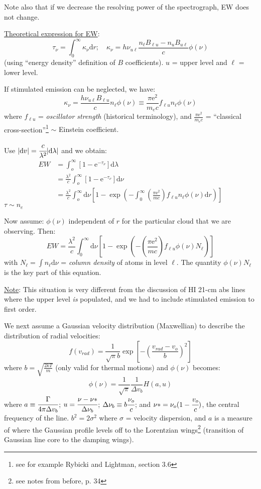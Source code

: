 \documentclass[12pt]{article}
\newcommand{\mar}[1]{\hspace{0pt}\marginpar{-\textcolor{black}{#1}-}}
\newcommand{\mynotes}[1]{\textcolor{mygreen}{#1}}
\begin{document}
\mar{91}Note also that if we decrease the resolving power of the
spectrograph, EW does not change.

\underline{Theoretical expression for EW}:$${
    \tau_{\nu} = \int_{0}^{\infty}{\kappa_{\nu}\mathrm{d}r};\quad
    \kappa_{\nu} = h\nu_{u\ell}
    \frac{n_{\ell}B_{\ell{u}}-n_{u}B_{u\ell}}{c}\phi(\nu)
}$$(using ``energy density'' definition of $B$ coefficients).
$u$ = upper level and $\ell$ = lower level.

If stimulated emission can be neglected, we have:$${
    \kappa_{\nu} = \frac{h\nu_{u\ell}B_{\ell{u}}}{c}n_{\ell}\phi(\nu) \equiv
    \frac{\pi\mathrm{e}^{2}}{m_{e}c}f_{\ell{u}}n_{\ell}\phi(\nu)
}$$
where $f_{\ell{u}}$ = \emph{oscillator strength}
\mynotes{(historical terminology)},
and $\frac{\pi\mathrm{e}^{2}}{m_{e}c}$ = ``classical cross-section''\footnote{
    see for example Rybicki and Lightman, section 3.6}
\mynotes{$\sim$ Einstein coefficient.}

Use
$\vert\mathrm{d}v\vert = \cfrac{c}{\lambda^{2}}\vert\mathrm{d}{\lambda}\vert$
and we obtain:
\begin{align*}
    EW &= \int_{o}^{\infty}{\left[1-\mathrm{e}^{-\tau_{\nu}}\right]\mathrm{d}\lambda}\\
    &= \frac{\lambda^{2}}{c}\int_{o}^{\infty}{
        \left[1-\mathrm{e}^{-\tau_{\nu}}\right]\mathrm{d}\nu}\\
    &= \frac{\lambda^{2}}{c}\int_{o}^{\infty}{\mathrm{d}\nu\left[1-\exp\left(
    -\int_{0}^{\infty}{\left(\frac{\pi\mathrm{e}^{2}}{mc}\right)
    f_{\ell{u}}n_{\ell}\phi(\nu)\mathrm{d}r}\right)\right]}
\end{align*}
\mynotes{$\tau\sim{n_{e}}$}

Now assume: $\phi(\nu)$ independent of $r$ for the particular cloud
that we are observing. Then:$${
    EW = \frac{\lambda^{2}}{c}\int_{0}^{\infty}{
        \mathrm{d}\nu\left[1-\exp\left(-\left(\frac{\pi\mathrm{e}^{2}}{mc}\right)
        f_{\ell{u}}\phi(\nu)N_{\ell}\right)\right]}
}$$with $N_{\ell} = \int{n_{\ell}\mathrm{d}\nu}$ = \emph{column density}
of atoms in level $\ell$. The quantity $\phi(\nu)N_{\ell}$ is the key
part of this equation.

\mar{92}\underline{Note}: This situation is very different from the
discussion of HI 21-cm abs lines where the upper level \emph{is}
populated, and we had to include stimulated emission to first order.

We next assume a Gaussian velocity distribution (Maxwellian) to
describe the distribution of radial velocities:$${
    f(v_{rad}) = \frac{1}{\sqrt{\pi}b}\exp\left[
        -\left(\frac{v_{rad}-v_{o}}{b}\right)^{2}\right]
}$$where $b = \sqrt{\frac{2kT}{m}}$ (only valid for thermal motions)
and $\phi(\nu)$ becomes:$${
    \phi(\nu) = \frac{1}{\sqrt{\pi}}\frac{1}{\Delta{v_{b}}}H(a,u)
}$$where $a \equiv \cfrac{\Gamma}{4\pi\Delta{v_{b}}}$;
$u = \cfrac{\nu-\nu*}{\Delta\nu_{b}}$;
$\Delta\nu_{b} \equiv b\cfrac{\nu_{o}}{c}$; and
$\nu* = \nu_{o}(1-\cfrac{v_{o}}{c})$, the central frequency of the line.
$b^{2} = 2\sigma^{2}$ where $\sigma$ = velocity dispersion, and $a$ is
a measure of where the Gaussian profile levels off to the Lorentzian
wings\footnote{see notes from before, p. 34}
\mynotes{(transition of Gaussian line core to the damping wings)}.
\end{document}
